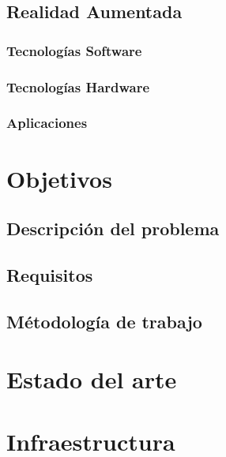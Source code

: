 \documentclass[a4paper, 12pt]{book}
\begin{document}
\section{Realidad Aumentada}
\label{sec:realidadaumentada}

\subsection{Tecnologías Software}
\label{subsec:tecnosoftware}

\subsection{Tecnologías Hardware}
\label{subsec:tecnohardware}

\subsection{Aplicaciones}
\label{subsec:raaplicaciones}

\chapter{Objetivos}
\label{sec:objetivos}

\section{Descripción del problema}
\label{subsec:descripcionproblema}

\section{Requisitos}
\label{subsec:requisitos}

\section{Métodología de trabajo}
\label{subsec:metodologiadetrabajo}

\chapter{Estado del arte} %
\label{sec:estadodelarte}

\chapter{Infraestructura}
\label{sec:infraestructura}
\end{document}
